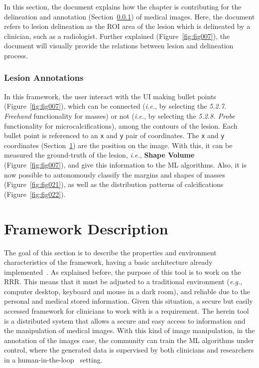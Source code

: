 In this section, the document explains how the chapter is contributing for the delineation and annotation (Section~\ref{sec:sec004003002002}) of medical images.
Here, the document refers to lesion delineation as the \ac{ROI} area of the lesion which is delineated by a clinician, such as a radiologist.
Further explained (Figure~\ref{fig:fig007}), the document will visually provide the relations between lesion and delineation process.

\subsubsection{Lesion Annotations}
\label{sec:sec004003002002}

In this framework, the user interact with the \ac{UI} making bullet points (Figure~\ref{fig:fig007}), which can be connected ({\it i.e.}, by selecting the {\it 5.2.7. Freehand} functionality for masses) or not ({\it i.e.}, by selecting the {\it 5.2.8. Probe} functionality for microcalcifications), among the contours of the lesion.
Each bullet point is referenced to an \texttt{x} and \texttt{y} pair of coordinates.
The \texttt{x} and \texttt{y} coordinates (Section~\ref{sec:sec004004}) are the position on the image.
With this, it can be measured the ground-truth of the lesion, {\it i.e.}, {\bf Shape Volume} (Figure~\ref{fig:fig007}), and give this information to the \ac{ML} algorithms.
Also, it is now possible to autonomously classify the margins and shapes of masses (Figure~\ref{fig:fig021}), as well as the distribution patterns of calcifications (Figure~\ref{fig:fig022}).

\section{Framework Description}
\label{sec:sec004004}

The goal of this section is to describe the properties and environment characteristics of the framework, having a basic architecture already implemented~\cite{calisto2017mimbcdui}.
As explained before, the purpose of this tool is to work on the \ac{RRR}.
This means that it must be adjusted to a traditional environment (\textit{e.g.}, computer desktop, keyboard and mouse in a dark room), and reliable due to the personal and medical stored information.
Given this situation, a secure but easily accessed framework for clinicians to work with is a requirement.
The herein tool is a distributed system that allows a secure and easy access to information and the manipulation of medical images.
With this kind of image manipulation, in the annotation of the images case, the community can train the \ac{ML} algorithms under control, where the generated data is supervised by both clinicians and researchers in a human-in-the-loop~\cite{10.1145/3306618.3314293} setting.

